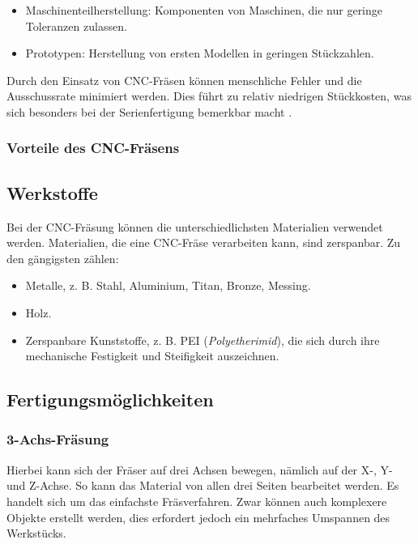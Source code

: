 \begin{itemize}
	\item Maschinenteilherstellung: Komponenten von Maschinen, die nur geringe Toleranzen zulassen.
	\item Prototypen: Herstellung von ersten Modellen in geringen Stückzahlen.
\end{itemize}

Durch den Einsatz von CNC-Fräsen können menschliche Fehler und die Ausschussrate minimiert werden. Dies führt zu relativ niedrigen Stückkosten, was sich besonders bei der Serienfertigung bemerkbar macht \cite{CNC-Fräsen_2} \cite{CNC-Fräsen_3}.

\subsubsection{Vorteile des CNC-Fräsens}










\subsection{Werkstoffe}
Bei der CNC-Fräsung können die unterschiedlichsten Materialien verwendet werden. Materialien, die eine CNC-Fräse verarbeiten kann, sind zerspanbar. Zu den gängigsten zählen:

\begin{itemize}
	\item Metalle, z. B. Stahl, Aluminium, Titan, Bronze, Messing.
	\item Holz.
	\item Zerspanbare Kunststoffe, z. B. PEI (\emph{Polyetherimid}), die sich durch ihre mechanische Festigkeit und Steifigkeit auszeichnen.
\end{itemize}
\cite{CNC-Fräsen_3} \cite{PEIZerspannung} \cite{PEIKunststoff-Polyetherimid}

\subsection{Fertigungsmöglichkeiten}

\subsubsection{3-Achs-Fräsung}
Hierbei kann sich der Fräser auf drei Achsen bewegen, nämlich auf der X-, Y- und Z-Achse. So kann das Material von allen drei Seiten bearbeitet werden. Es handelt sich um das einfachste Fräsverfahren. Zwar können auch komplexere Objekte erstellt werden, dies erfordert jedoch ein mehrfaches Umspannen des Werkstücks.

